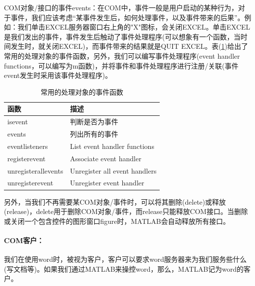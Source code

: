            \par
            COM对象/接口的事件events：在COM中，事件一般是用户启动的某种行为，对于事件，我们应该考虑“某事件发生后，如何处理事件，以及事件带来的后果”。例如：我们单击EXCEL服务器窗口右上角的"X"图标，会关闭EXCEL。单击EXCEL是我们发出的事件，事件发生后触动了事件处理程序(可以想象有一个函数，当时间发生时，就关闭EXCEL)，而事件带来的结果就是QUIT EXCEL。表(\ref{tab:常用的处理对象的事件函数})给出了常用的处理对象的事件函数，另外，我们可以编写事件处理程序(event handler functions，可以编写为m函数)，并将事件和事件处理程序进行注册/关联(事件event发生时采用该事件处理程序)。
            \begin{table}[H]
            \caption{常用的处理对象的事件函数}
            \label{tab:常用的处理对象的事件函数}
            \centering
            \begin{tabular}{l|l}
                \toprule
                函数 & 描述 \\
                \midrule
                isevent & 判断是否为事件\\
                events & 列出所有的事件\\
                eventlisteners & List event handler functions\\
                registerevent & Associate event handler\\
                unregisterallevents & Unregister all event handlers\\
                unregisterevent & Unregister event handler\\
                \bottomrule
            \end{tabular}
            \end{table}
            \par
            另外，当我们不再需要某COM对象/事件时，可以将其删除(delete)或释放(release)，delete用于删除COM对象/事件，而release只能释放COM接口。当删除或关闭一个包含控件的图形窗口figure时，MATLAB会自动释放所有接口。
            \paragraph{COM客户：}我们在使用word时，被视为客户，客户可以要求word服务器来为我们服务些什么(写文档等)。如果我们通过MATLAB来操控word，那么，MATLAB记为word的客户。
